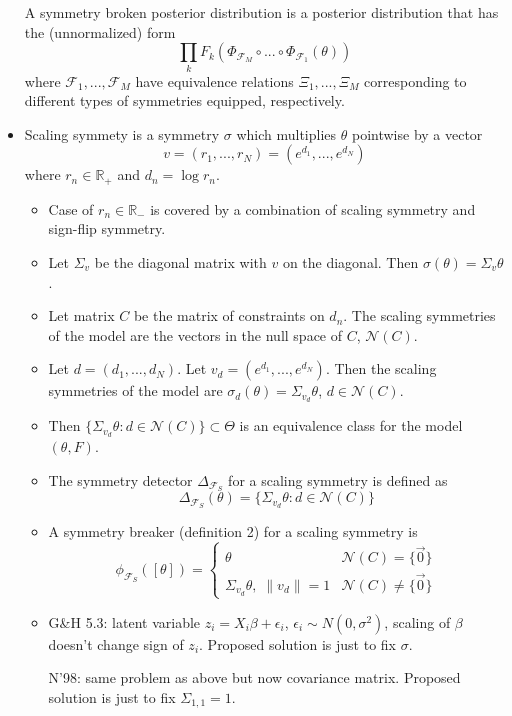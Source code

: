 \documentclass{article}
\begin{document}
\begin{itemize}
A symmetry broken posterior distribution is a posterior distribution that has the (unnormalized) form
\[
\prod_kF_k(\Phi_{\mathcal{F}_M}\circ ... \circ \Phi_{\mathcal{F}_1}(\theta))
\]
where $\mathcal{F}_1,...,\mathcal{F}_M$ have equivalence relations $\Xi_1,...,\Xi_M$ corresponding to different types of symmetries equipped, respectively.

\item
Scaling symmety is a symmetry $\sigma$ which multiplies $\theta$ pointwise by a vector
\[
v=(r_1,...,r_N) = (e^{d_1},...,e^{d_N})
\]
where $r_n\in \mathbb{R}_+$ and $d_n=\log r_n$.

\begin{itemize}

\item
Case of $r_n\in\mathbb{R}_-$ is covered by a combination of scaling symmetry and sign-flip symmetry.

\item
Let $\Sigma_v$ be the diagonal matrix with $v$ on the diagonal. Then $\sigma(\theta)=\Sigma_v\theta$.

\item
Let matrix $C$ be the matrix of constraints on $d_n$. The scaling symmetries of the model are the vectors in the null space of $C$, $\mathcal{N}(C)$.

\item
Let $d=(d_1,...,d_N)$. Let $v_d = (e^{d_1},...,e^{d_N})$. Then the scaling symmetries of the model are $\sigma_{d}(\theta)=\Sigma_{v_d}\theta$, $d\in\mathcal{N}(C)$.

\item
Then $\{\Sigma_{v_d}\theta:d\in\mathcal{N}(C)\}\subset\Theta$ is an equivalence class for the model $(\theta,F)$.

\item
The symmetry detector $\Delta_{\mathcal{F}_S}$ for a scaling symmetry is defined as
\[
\Delta_{\mathcal{F}_S}(\theta) = \{\Sigma_{v_d}\theta: d\in\mathcal{N}(C)\}
\]

\item A symmetry breaker (definition 2) for a scaling symmetry is
\[
\phi_{\mathcal{F}_S}([\theta]) =
\begin{cases}
\theta & \mathcal{N}(C) = \{\vec{0}\} \\
\Sigma_{v_d}\theta, \; \|v_d\|=1 & \mathcal{N}(C) \neq \{\vec{0}\}
\end{cases}
\]

\item
G\&H 5.3: latent variable $z_i=X_i\beta+\epsilon_i$, $\epsilon_i\sim N(0,\sigma^2)$, scaling of $\beta$ doesn't change sign of $z_i$. Proposed solution is just to fix $\sigma$.

N'98: same problem as above but now covariance matrix. Proposed solution is just to fix $\Sigma_{1,1}=1$.

\end{itemize}

\end{itemize}
\end{document}
